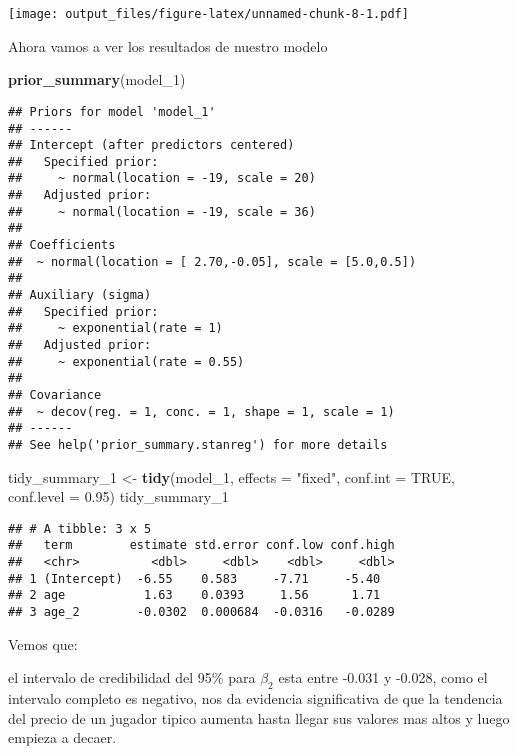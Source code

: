 \documentclass[
]{article}
\newenvironment{Shaded}{\begin{snugshade}}{\end{snugshade}}
\newcommand{\AttributeTok}[1]{\textcolor[rgb]{0.13,0.29,0.53}{#1}}
\newcommand{\ConstantTok}[1]{\textcolor[rgb]{0.56,0.35,0.01}{#1}}
\newcommand{\FloatTok}[1]{\textcolor[rgb]{0.00,0.00,0.81}{#1}}
\newcommand{\FunctionTok}[1]{\textcolor[rgb]{0.13,0.29,0.53}{\textbf{#1}}}
\newcommand{\NormalTok}[1]{#1}
\newcommand{\OtherTok}[1]{\textcolor[rgb]{0.56,0.35,0.01}{#1}}
\newcommand{\StringTok}[1]{\textcolor[rgb]{0.31,0.60,0.02}{#1}}
\begin{document}
\texttt{[image: output\_files/figure-latex/unnamed-chunk-8-1.pdf]}

Ahora vamos a ver los resultados de nuestro modelo

\begin{Shaded}
\begin{Highlighting}[]
\FunctionTok{prior\_summary}\NormalTok{(model\_1)}
\end{Highlighting}
\end{Shaded}

\begin{verbatim}
## Priors for model 'model_1' 
## ------
## Intercept (after predictors centered)
##   Specified prior:
##     ~ normal(location = -19, scale = 20)
##   Adjusted prior:
##     ~ normal(location = -19, scale = 36)
## 
## Coefficients
##  ~ normal(location = [ 2.70,-0.05], scale = [5.0,0.5])
## 
## Auxiliary (sigma)
##   Specified prior:
##     ~ exponential(rate = 1)
##   Adjusted prior:
##     ~ exponential(rate = 0.55)
## 
## Covariance
##  ~ decov(reg. = 1, conc. = 1, shape = 1, scale = 1)
## ------
## See help('prior_summary.stanreg') for more details
\end{verbatim}

\begin{Shaded}
\begin{Highlighting}[]
\NormalTok{tidy\_summary\_1 }\OtherTok{\textless{}{-}} \FunctionTok{tidy}\NormalTok{(model\_1, }\AttributeTok{effects =} \StringTok{"fixed"}\NormalTok{,}
                       \AttributeTok{conf.int =} \ConstantTok{TRUE}\NormalTok{, }\AttributeTok{conf.level =} \FloatTok{0.95}\NormalTok{)}
\NormalTok{tidy\_summary\_1}
\end{Highlighting}
\end{Shaded}

\begin{verbatim}
## # A tibble: 3 x 5
##   term        estimate std.error conf.low conf.high
##   <chr>          <dbl>     <dbl>    <dbl>     <dbl>
## 1 (Intercept)  -6.55    0.583     -7.71     -5.40  
## 2 age           1.63    0.0393     1.56      1.71  
## 3 age_2        -0.0302  0.000684  -0.0316   -0.0289
\end{verbatim}

Vemos que:

el intervalo de credibilidad del 95\% para \(\beta_2\) esta entre -0.031
y -0.028, como el intervalo completo es negativo, nos da evidencia
significativa de que la tendencia del precio de un jugador tipico
aumenta hasta llegar sus valores mas altos y luego empieza a decaer.
\end{document}

